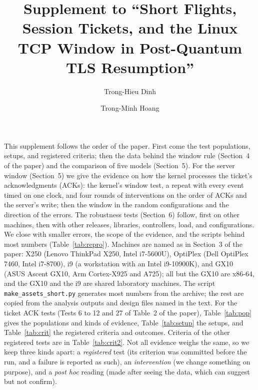 \documentclass[9pt]{article}
\title{Supplement to ``Short Flights, Session Tickets, and the Linux TCP Window in Post-Quantum TLS Resumption''}
\author{Trong-Hieu Dinh \and Trong-Minh Hoang}
\date{}
\begin{document}
\maketitle
This supplement follows the order of the paper. First come the test populations, setups, and registered criteria; then the data behind the window rule (Section~4 of the paper) and the comparison of five models (Section~5). For the server window (Section~5) we give the evidence on how the kernel processes the ticket's acknowledgments (ACKs): the kernel's window test, a repeat with every event timed on one clock, and four rounds of interventions on the order of ACKs and the server's write; then the window in the random configurations and the direction of the errors. The robustness tests (Section~6) follow, first on other machines, then with other releases, libraries, controllers, load, and configurations. We close with smaller errors, the scope of the evidence, and the scripts behind most numbers (Table~\ref{tab:repro}). Machines are named as in Section~3 of the paper: X250 (Lenovo ThinkPad X250, Intel i7-5600U), OptiPlex (Dell OptiPlex 7460, Intel i7-8700), i9 (a workstation with an Intel i9-10900K), and GX10 (ASUS Ascent GX10, Arm Cortex-X925 and A725); all but the GX10 are x86-64, and the GX10 and the i9 are shared laboratory machines. The script \texttt{make\_assets\_short.py} generates most numbers from the archive; the rest are copied from the analysis outputs and design files named in the text. For the ticket ACK tests (Tests 6 to 12 and 27 of Table~2 of the paper), Table~\ref{tab:pop} gives the populations and kinds of evidence, Table~\ref{tab:setup} the setups, and Table~\ref{tab:crit} the registered criteria and outcomes. Criteria of the other registered tests are in Table~\ref{tab:crit2}. Not all evidence weighs the same, so we keep three kinds apart: a \emph{registered} test (its criterion was committed before the run, and a failure is reported as such), an \emph{intervention} (we change something on purpose), and a \emph{post hoc} reading (made after seeing the data, which can suggest but not confirm).
\end{document}
